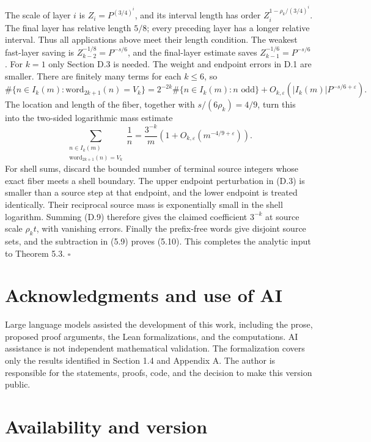 \documentclass[11pt,a4paper]{article}
\begin{document}
The scale of layer \(i\) is \(Z_i=P^{(3/4)^i}\), and its interval length
has order \(Z_i^{1-\rho_k/(3/4)^i}\). The final layer has relative
length \(5/8\); every preceding layer has a longer relative interval.
Thus all applications above meet their length condition. The weakest
fast-layer saving is \(Z_{k-2}^{-1/8}=P^{-s/6}\), and the final-layer
estimate saves \(Z_{k-1}^{-1/6}=P^{-s/6}\). For \(k=1\) only Section D.3
is needed. The weight and endpoint errors in D.1 are smaller. There are
finitely many terms for each \(k\le6\), so \[
\#\{n\in I_k(m):\mathrm{word}_{2k+1}(n)=V_k\}
 =2^{-2k}\#\{n\in I_k(m):n\text{ odd}\}
 +O_{k,\varepsilon}(|I_k(m)|P^{-s/6+\varepsilon}).
\tag{D.8}
\] The location and length of the fiber, together with
\(s/(6\rho_k)=4/9\), turn this into the two-sided logarithmic mass
estimate \[
\sum_{\substack{n\in I_k(m)\\\mathrm{word}_{2k+1}(n)=V_k}}\frac1n
 =\frac{3^{-k}}m\left(1+O_{k,\varepsilon}
 (m^{-4/9+\varepsilon})\right).
\tag{D.9}
\] For shell sums, discard the bounded number of terminal source
integers whose exact fiber meets a shell boundary. The upper endpoint
perturbation in (D.3) is smaller than a source step at that endpoint,
and the lower endpoint is treated identically. Their reciprocal source
mass is exponentially small in the shell logarithm. Summing (D.9)
therefore gives the claimed coefficient \(3^{-k}\) at source scale
\(\rho_k t\), with vanishing errors. Finally the prefix-free words give
disjoint source sets, and the subtraction in (5.9) proves (5.10). This
completes the analytic input to Theorem 5.3. \(\square\)

\section{Acknowledgments and use of
AI}\label{acknowledgments-and-use-of-ai}

Large language models assisted the development of this work, including
the prose, proposed proof arguments, the Lean formalizations, and the
computations. AI assistance is not independent mathematical validation.
The formalization covers only the results identified in Section 1.4 and
Appendix A. The author is responsible for the statements, proofs, code,
and the decision to make this version public.

\section{Availability and version}\label{availability-and-version}
\end{document}
